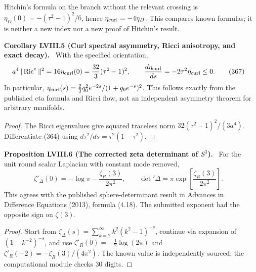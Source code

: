 \documentclass[11pt,a4paper,oneside]{book}
\newcommand{\statement}[3]{\par\medskip\noindent\textbf{#1 #2 (#3).}\ }
\begin{document}
Hitchin's formula on the branch without the relevant crossing is $\eta_D(0)=-(\tau^2-1)^2/6$, hence $\eta_{\rm curl}=-4\eta_D$. This compares known formulas; it is neither a new index nor a new proof of Hitchin's result.
\statement{Corollary}{LVIII.5}{Curl spectral asymmetry, Ricci anisotropy, and exact decay}
With the specified orientation,
\begin{equation}a^4\|\operatorname{Ric}^\circ\|^2=16\eta_{\rm curl}(0)=\frac{32}3(\tau^2-1)^2,\qquad\frac{d\eta_{\rm curl}}{ds}=-2\tau^2\eta_{\rm curl}\le0.\tag{367}\end{equation}
In particular, $\eta_{\rm curl}(s)=\frac23q_0^2e^{-2s}/(1+q_0e^{-s})^2$. This follows exactly from the published eta formula and Ricci flow, not an independent asymmetry theorem for arbitrary manifolds.
\begin{proof}
The Ricci eigenvalues give squared traceless norm $32(\tau^2-1)^2/(3a^4)$. Differentiate (364) using $d\tau^2/ds=\tau^2(1-\tau^2)$.
\end{proof}
\statement{Proposition}{LVIII.6}{The corrected zeta determinant of $S^3$}
For the unit round scalar Laplacian with constant mode removed,
\begin{equation}\zeta'_\Delta(0)=-\log\pi-\frac{\zeta_R(3)}{2\pi^2},\qquad\det'\Delta=\pi\exp\left[\frac{\zeta_R(3)}{2\pi^2}\right].\tag{368}\end{equation}
This agrees with the published sphere-determinant result in Advances in Difference Equations (2013), formula (4.18). The submitted exponent had the opposite sign on $\zeta(3)$.
\begin{proof}
Start from $\zeta_\Delta(s)=\sum_{k=2}^\infty k^2(k^2-1)^{-s}$, continue via expansion of $(1-k^{-2})^{-s}$, and use $\zeta'_R(0)=-\tfrac12\log(2\pi)$ and $\zeta'_R(-2)=-\zeta_R(3)/(4\pi^2)$. The known value is independently sourced; the computational module checks 30 digits.
\end{proof}
\end{document}
